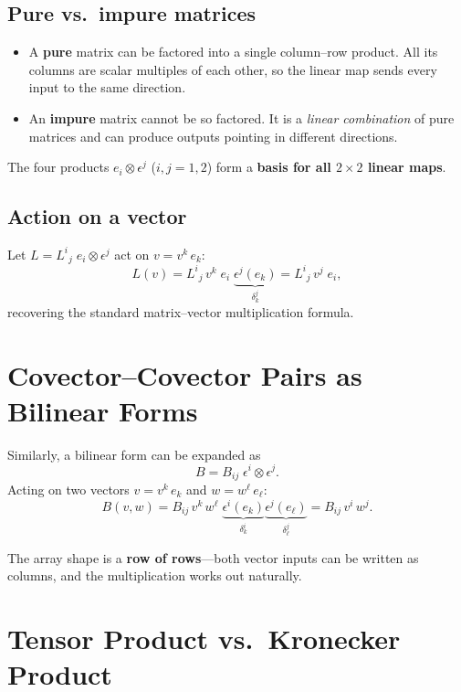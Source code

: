 \documentclass[12pt, a4paper]{report}
\theoremstyle{definition}
\theoremstyle{plain}
\theoremstyle{remark}
\begin{document}
\subsection*{Pure vs.\ impure matrices}

\begin{itemize}[nosep]
    \item A \textbf{pure} matrix can be factored into a single column--row product.
          All its columns are scalar multiples of each other, so the linear map
          sends every input to the same direction.
    \item An \textbf{impure} matrix cannot be so factored.  It is a
          \emph{linear combination} of pure matrices and can produce outputs
          pointing in different directions.
\end{itemize}

The four products $e_i \otimes \epsilon^{j}$ ($i,j = 1,2$) form a
\textbf{basis for all $2\times 2$ linear maps}.

\subsection*{Action on a vector}

Let $L = L^{i}{}_{j}\; e_i \otimes \epsilon^{j}$ act on $v = v^{k}\,e_k$:
\[
    L(v) = L^{i}{}_{j}\,v^{k}\; e_i\;\underbrace{\epsilon^{j}(e_k)}_{\delta^{j}_{k}}
         = L^{i}{}_{j}\,v^{j}\; e_i,
\]
recovering the standard matrix--vector multiplication formula.

\section{Covector--Covector Pairs as Bilinear Forms}\label{sec:cov-cov-pairs}

Similarly, a bilinear form can be expanded as
\begin{equation}
    B = B_{ij}\; \epsilon^{i} \otimes \epsilon^{j}.
\end{equation}
Acting on two vectors $v = v^{k}\,e_k$ and $w = w^{\ell}\,e_\ell$:
\[
    B(v,w) = B_{ij}\,v^{k}\,w^{\ell}\;
    \underbrace{\epsilon^{i}(e_k)}_{\delta^{i}_k}
    \underbrace{\epsilon^{j}(e_\ell)}_{\delta^{j}_\ell}
    = B_{ij}\,v^{i}\,w^{j}.
\]

The array shape is a \textbf{row of rows}---both vector inputs can be written as
columns, and the multiplication works out naturally.

\section{Tensor Product vs.\ Kronecker Product}\label{sec:tp-vs-kp}
\end{document}
